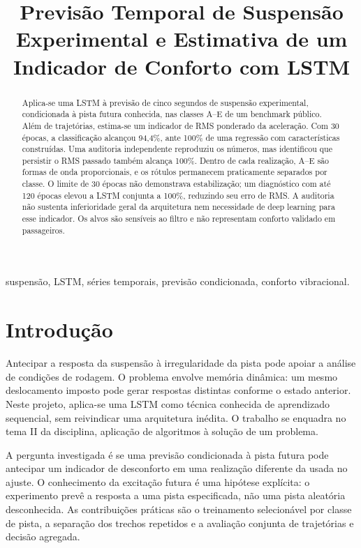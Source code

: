 \documentclass[conference]{IEEEtran}
\title{Previsão Temporal de Suspensão Experimental e Estimativa de um Indicador de Conforto com LSTM}
\author{\IEEEauthorblockN{Pedro Druck Montalvão Reis}\IEEEauthorblockA{Disciplina: Inteligência Artificial II}}
\begin{document}
\maketitle
\begin{abstract}
Aplica-se uma LSTM à previsão de cinco segundos de suspensão experimental, condicionada à pista futura conhecida, nas classes A--E de um benchmark público. Além de trajetórias, estima-se um indicador de RMS ponderado da aceleração. Com 30 épocas, a classificação alcançou 94,4\%, ante 100\% de uma regressão com características construídas. Uma auditoria independente reproduziu os números, mas identificou que persistir o RMS passado também alcança 100\%. Dentro de cada realização, A--E são formas de onda proporcionais, e os rótulos permanecem praticamente separados por classe. O limite de 30 épocas não demonstrava estabilização; um diagnóstico com até 120 épocas elevou a LSTM conjunta a 100\%, reduzindo seu erro de RMS. A auditoria não sustenta inferioridade geral da arquitetura nem necessidade de deep learning para esse indicador. Os alvos são sensíveis ao filtro e não representam conforto validado em passageiros.
\end{abstract}
\begin{IEEEkeywords}
suspensão, LSTM, séries temporais, previsão condicionada, conforto vibracional.
\end{IEEEkeywords}

\section{Introdução}
Antecipar a resposta da suspensão à irregularidade da pista pode apoiar a análise de condições de rodagem. O problema envolve memória dinâmica: um mesmo deslocamento imposto pode gerar respostas distintas conforme o estado anterior. Neste projeto, aplica-se uma LSTM como técnica conhecida de aprendizado sequencial, sem reivindicar uma arquitetura inédita. O trabalho se enquadra no tema II da disciplina, aplicação de algoritmos à solução de um problema.

A pergunta investigada é se uma previsão condicionada à pista futura pode antecipar um indicador de desconforto em uma realização diferente da usada no ajuste. O conhecimento da excitação futura é uma hipótese explícita: o experimento prevê a resposta a uma pista especificada, não uma pista aleatória desconhecida. As contribuições práticas são o treinamento selecionável por classe de pista, a separação dos trechos repetidos e a avaliação conjunta de trajetórias e decisão agregada.
\end{document}
